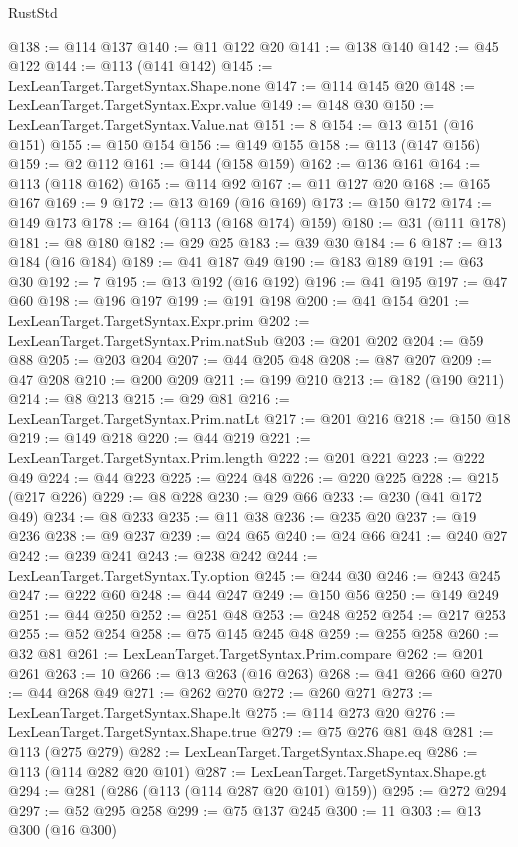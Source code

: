 \begin{lexlean}{RustStd}
\begin{coremodule}
@138 := @114 @137
@140 := @11 @122 @20
@141 := @138 @140
@142 := @45 @122
@144 := @113 (@141 @142)
@145 := LexLeanTarget.TargetSyntax.Shape.none
@147 := @114 @145 @20
@148 := LexLeanTarget.TargetSyntax.Expr.value
@149 := @148 @30
@150 := LexLeanTarget.TargetSyntax.Value.nat
@151 := 8
@154 := @13 @151 (@16 @151)
@155 := @150 @154
@156 := @149 @155
@158 := @113 (@147 @156)
@159 := @2 @112
@161 := @144 (@158 @159)
@162 := @136 @161
@164 := @113 (@118 @162)
@165 := @114 @92
@167 := @11 @127 @20
@168 := @165 @167
@169 := 9
@172 := @13 @169 (@16 @169)
@173 := @150 @172
@174 := @149 @173
@178 := @164 (@113 (@168 @174) @159)
@180 := @31 (@111 @178)
@181 := @8 @180
@182 := @29 @25
@183 := @39 @30
@184 := 6
@187 := @13 @184 (@16 @184)
@189 := @41 @187 @49
@190 := @183 @189
@191 := @63 @30
@192 := 7
@195 := @13 @192 (@16 @192)
@196 := @41 @195
@197 := @47 @60
@198 := @196 @197
@199 := @191 @198
@200 := @41 @154
@201 := LexLeanTarget.TargetSyntax.Expr.prim
@202 := LexLeanTarget.TargetSyntax.Prim.natSub
@203 := @201 @202
@204 := @59 @88
@205 := @203 @204
@207 := @44 @205 @48
@208 := @87 @207
@209 := @47 @208
@210 := @200 @209
@211 := @199 @210
@213 := @182 (@190 @211)
@214 := @8 @213
@215 := @29 @81
@216 := LexLeanTarget.TargetSyntax.Prim.natLt
@217 := @201 @216
@218 := @150 @18
@219 := @149 @218
@220 := @44 @219
@221 := LexLeanTarget.TargetSyntax.Prim.length
@222 := @201 @221
@223 := @222 @49
@224 := @44 @223
@225 := @224 @48
@226 := @220 @225
@228 := @215 (@217 @226)
@229 := @8 @228
@230 := @29 @66
@233 := @230 (@41 @172 @49)
@234 := @8 @233
@235 := @11 @38
@236 := @235 @20
@237 := @19 @236
@238 := @9 @237
@239 := @24 @65
@240 := @24 @66
@241 := @240 @27
@242 := @239 @241
@243 := @238 @242
@244 := LexLeanTarget.TargetSyntax.Ty.option
@245 := @244 @30
@246 := @243 @245
@247 := @222 @60
@248 := @44 @247
@249 := @150 @56
@250 := @149 @249
@251 := @44 @250
@252 := @251 @48
@253 := @248 @252
@254 := @217 @253
@255 := @52 @254
@258 := @75 @145 @245 @48
@259 := @255 @258
@260 := @32 @81
@261 := LexLeanTarget.TargetSyntax.Prim.compare
@262 := @201 @261
@263 := 10
@266 := @13 @263 (@16 @263)
@268 := @41 @266 @60
@270 := @44 @268 @49
@271 := @262 @270
@272 := @260 @271
@273 := LexLeanTarget.TargetSyntax.Shape.lt
@275 := @114 @273 @20
@276 := LexLeanTarget.TargetSyntax.Shape.true
@279 := @75 @276 @81 @48
@281 := @113 (@275 @279)
@282 := LexLeanTarget.TargetSyntax.Shape.eq
@286 := @113 (@114 @282 @20 @101)
@287 := LexLeanTarget.TargetSyntax.Shape.gt
@294 := @281 (@286 (@113 (@114 @287 @20 @101) @159))
@295 := @272 @294
@297 := @52 @295 @258
@299 := @75 @137 @245
@300 := 11
@303 := @13 @300 (@16 @300)

\end{coremodule}
\end{lexlean}
